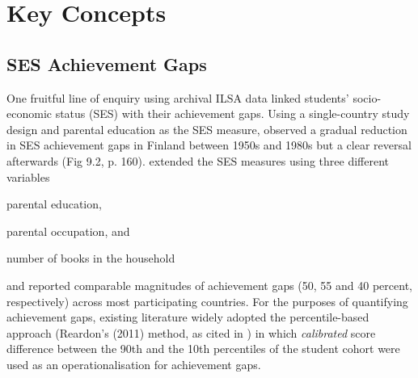 \documentclass[
    a4paper,            %
    12pt,               %
    stu,                %
    donotrepeattitle,   %
    noextraspace,       %
    floatsintext,       %
    biblatex,           %
    colorlinks=true,        %
    linkcolor=red,          %
    anchorcolor=black,      %
    citecolor=blue,         %
    urlcolor=blue,          %
    bookmarks=true,         %
    bookmarksopen=false,    %
    bookmarksnumbered=true  %
]{apa7}
\begin{document}





\section{Key Concepts}

\subsection{SES Achievement Gaps}

One fruitful line of enquiry using archival ILSA data linked students' socio-economic status (SES) with their achievement gaps.
Using a single-country study design and parental education as the SES measure, \textcite{salmelaaro:2019} observed a gradual reduction in SES achievement gaps in Finland between 1950s and 1980s but a clear reversal afterwards (Fig 9.2, p. 160). \textcite{chmielewski:2019} extended the SES measures using three different variables
\begin{seriate}
    \item parental education,
    \item parental occupation, and
    \item number of books in the household
\end{seriate}%
and reported comparable magnitudes of achievement gaps (50, 55 and 40 percent, respectively) across most participating countries.
For the purposes of quantifying achievement gaps, existing literature widely adopted the percentile-based approach (Reardon's (2011) method, as cited in \textcite{salmelaaro:2019}) in which \emph{calibrated} score difference between the 90th and the 10th percentiles of the student cohort were used as an operationalisation for achievement gaps.
\end{document}
